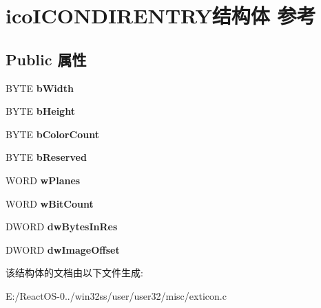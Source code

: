 \hypertarget{structico_i_c_o_n_d_i_r_e_n_t_r_y}{}\section{ico\+I\+C\+O\+N\+D\+I\+R\+E\+N\+T\+R\+Y结构体 参考}
\label{structico_i_c_o_n_d_i_r_e_n_t_r_y}
\subsection*{Public 属性}
\begin{DoxyCompactItemize}
\item 
\mbox{\label{structico_i_c_o_n_d_i_r_e_n_t_r_y_a2bd01df83adeb5fc8c1e201aacd98c2c}} 
B\+Y\+TE {\bfseries b\+Width}
\item 
\mbox{\label{structico_i_c_o_n_d_i_r_e_n_t_r_y_abb35486ee3574c8a3320f0ee7545a108}} 
B\+Y\+TE {\bfseries b\+Height}
\item 
\mbox{\label{structico_i_c_o_n_d_i_r_e_n_t_r_y_a6de82f053e59b98246fb437375df6b2c}} 
B\+Y\+TE {\bfseries b\+Color\+Count}
\item 
\mbox{\label{structico_i_c_o_n_d_i_r_e_n_t_r_y_ab4f1acfe8b4b8054df7c4fb45dfbc82f}} 
B\+Y\+TE {\bfseries b\+Reserved}
\item 
\mbox{\label{structico_i_c_o_n_d_i_r_e_n_t_r_y_a95e4ec8a9bfbfc63b0face1604078b42}} 
W\+O\+RD {\bfseries w\+Planes}
\item 
\mbox{\label{structico_i_c_o_n_d_i_r_e_n_t_r_y_a2ecea6c89af0266868a53979edbabb68}} 
W\+O\+RD {\bfseries w\+Bit\+Count}
\item 
\mbox{\label{structico_i_c_o_n_d_i_r_e_n_t_r_y_aa2efb43de4773b36d4d38bbfa8dfe862}} 
D\+W\+O\+RD {\bfseries dw\+Bytes\+In\+Res}
\item 
\mbox{\label{structico_i_c_o_n_d_i_r_e_n_t_r_y_a4cd7122ab1cd8d13626913b207d4bbe7}} 
D\+W\+O\+RD {\bfseries dw\+Image\+Offset}
\end{DoxyCompactItemize}


该结构体的文档由以下文件生成\+:\begin{DoxyCompactItemize}
\item 
E\+:/\+React\+O\+S-\/0../win32ss/user/user32/misc/exticon.\+c\end{DoxyCompactItemize}
